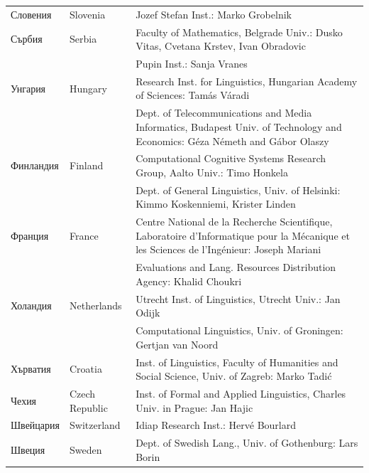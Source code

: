 \begin{longtable}{llp{105mm}}
Словения & \textcolor{grey1}{Slovenia} & Jozef Stefan Inst.: Marko Grobelnik \\ \addlinespace 
Сърбия & \textcolor{grey1}{Serbia} & Faculty of Mathematics, Belgrade Univ.: Dusko Vitas, Cvetana Krstev, Ivan Obradovic \\ \addlinespace  & & Pupin Inst.: Sanja Vranes \\ \addlinespace  
Унгария & \textcolor{grey1}{Hungary} & Research Inst. for Linguistics, Hungarian Academy of Sciences: Tamás Váradi\\  \addlinespace  & & Dept. of Telecommunications and Media Informatics, Budapest Univ. of Technology and Economics: Géza Németh and Gábor Olaszy\\ \addlinespace
Финландия & \textcolor{grey1}{Finland} & Computational Cognitive Systems Research Group, Aalto Univ.: Timo Honkela\\ \addlinespace   & & Dept. of General Linguistics, Univ. of Helsinki: Kimmo Koskenniemi, Krister Linden \\ \addlinespace
Франция & \textcolor{grey1}{France} & Centre National de la Recherche Scientifique, Laboratoire d'Informatique pour la Mécanique et les Sciences de l'Ingénieur: Joseph Mariani \\ \addlinespace   & & Evaluations and Lang. Resources Distribution Agency: Khalid Choukri\\ \addlinespace 
Холандия & \textcolor{grey1}{Netherlands} & Utrecht Inst. of Linguistics, Utrecht Univ.: Jan Odijk\\ \addlinespace & & Computational Linguistics, Univ. of Groningen: Gertjan van Noord\\ \addlinespace
Хърватия & \textcolor{grey1}{Croatia} & Inst. of Linguistics, Faculty of Humanities and Social Science, Univ. of Zagreb: Marko Tadić \\ \addlinespace
Чехия & \textcolor{grey1}{Czech Republic} & Inst. of Formal and Applied Linguistics, Charles Univ. in Prague: Jan Hajic \\ \addlinespace
Швейцария & \textcolor{grey1}{Switzerland} & Idiap Research Inst.: Hervé Bourlard \\ \addlinespace 
Швеция & \textcolor{grey1}{Sweden} & Dept. of Swedish Lang., Univ. of Gothenburg: Lars Borin
\end{longtable}
\normalsize


\renewcommand*{\figureformat}{}
\renewcommand*{\captionformat}{}

\cleardoublepage

\label{whitepaperseries}


